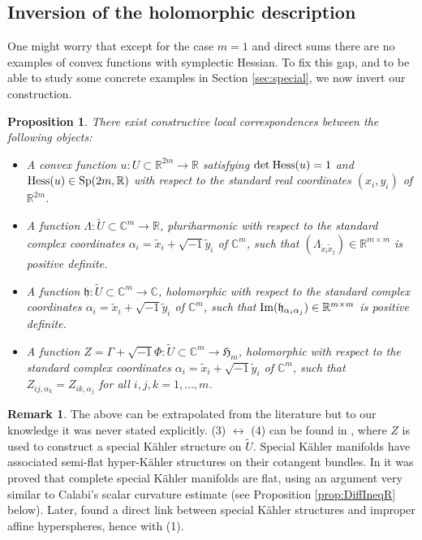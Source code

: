\documentclass[11pt,reqno]{amsart}
\newcommand{\C}{\mathbb{C}}
\newcommand{\R}{\mathbb{R}}
\theoremstyle{plain}
\newtheorem{proposition}[theorem]{Proposition}
\theoremstyle{definition}
\newtheorem{remark}[theorem]{Remark}
\numberwithin{equation}{section}
\begin{document}
\subsection{Inversion of the holomorphic description}\label{2.5}

One might worry that except for the case $m = 1$ and direct sums there are no examples of convex functions with symplectic Hessian. To fix this gap, and to be able to study some concrete examples in Section \ref{sec:special}, we now invert our construction.

\begin{proposition}\label{MACorr}
There exist constructive local correspondences between the following objects:
\begin{itemize}
    \item[\textup{(1)}] A convex function $u:U \subset \R^{2m} \to\R$ satisfying $\det\hspace{0.25mm} {\rm Hess}(u) = 1$ and ${\rm Hess}(u)\in{\rm Sp}(2m,\R)$ with respect to the standard real coordinates $(x_i,y_i)$ of $\mathbb{R}^{2m}$.
    \item[\textup{(2)}] A function $\Lambda:\widetilde{U} \subset \C^m \to\R$, pluriharmonic with respect to the standard complex coordinates $\alpha_{i}=\tilde{x}_{i}+\sqrt{-1}\tilde{y}_{i}$ of $\mathbb{C}^m$, such that $(\Lambda_{\tilde{x}_{i}\tilde{x}_{j}}) \in \mathbb{R}^{m\times m}$ is positive definite.
    \item[\textup{(3)}] A function $\mathfrak{h}:\widetilde{U} \subset \C^m \to\C$, holomorphic with respect to the standard complex coordinates $\alpha_{i}=\tilde{x}_{i}+\sqrt{-1}\tilde{y}_{i}$ of $\mathbb{C}^m$, such that ${\rm Im}(\mathfrak{h}_{\alpha_i\alpha_j}) \in \R^{m\times m}$ is positive definite.
    \item[\textup{(4)}] A function $Z = \Gamma + \sqrt{-1}\Phi:\widetilde{U} \subset \C^m \to\mathfrak{H}_m$, holomorphic with respect to the standard complex coordinates $\alpha_{i}=\tilde{x}_{i}+\sqrt{-1}\tilde{y}_{i}$ of $\mathbb{C}^m$, such that $Z_{ij,\alpha_k}=Z_{ik,\alpha_j}$ for all $i,j,k = 1,\ldots,m$.
\end{itemize}
\end{proposition}

\begin{remark}
The above can be extrapolated from the literature but to our knowledge it was never stated explicitly. (3) $\longleftrightarrow$ (4) can be found in \cite{Freed}, where $Z$ is used to construct a special Kähler structure on $\widetilde{U}$. Special Kähler manifolds have associated semi-flat hyper-Kähler structures on their cotangent bundles. In \cite{Lu} it was proved that complete special Kähler manifolds are flat, using an argument very similar to Calabi's scalar curvature estimate \cite{EC} (see Proposition \ref{prop:DiffIneqR} below). Later, \cite{ACD,BC,VC} found a direct link between special Kähler structures and improper affine hyperspheres, hence with (1).
\end{remark}
\end{document}
